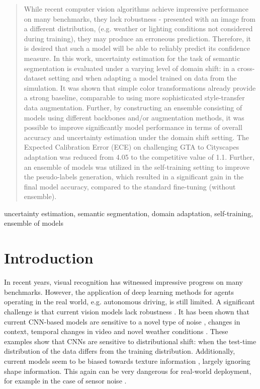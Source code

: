 \documentclass[conference]{IEEEtran}
\begin{document}
\begin{abstract}
While recent computer vision algorithms achieve impressive performance on many benchmarks, they lack robustness - presented with an image from a different distribution, (e.g. weather or lighting conditions not considered during training), they may produce an erroneous prediction. 
Therefore, it is desired that such a model will be able to reliably predict its confidence measure.
In this work, uncertainty estimation for the task of semantic segmentation is evaluated under a varying level of domain shift: in a cross-dataset setting and when adapting a model trained on data from the simulation. It was shown that simple color transformations already provide a strong baseline, comparable to using more sophisticated style-transfer data augmentation. Further, by constructing an ensemble consisting of models using different backbones and/or augmentation methods, it was possible to improve significantly model performance in terms of overall accuracy and uncertainty estimation under the domain shift setting.  The Expected Calibration Error (ECE) on challenging GTA to Cityscapes adaptation was reduced from 4.05 to the competitive value of 1.1.  Further, an ensemble of models was utilized in the self-training setting to improve the pseudo-labels generation, which resulted in a significant gain in the final model accuracy, compared to the standard fine-tuning (without ensemble).

\end{abstract}

\begin{IEEEkeywords}
uncertainty estimation, semantic segmentation, domain adaptation, self-training, ensemble of models
\end{IEEEkeywords}

\section{Introduction}

In recent years, visual recognition has witnessed impressive progress on many benchmarks. However, the application of deep learning methods for agents operating in the real world, e.g. autonomous driving, is still limited. A significant challenge is that current vision models lack robustness \cite{concrete}. It has been shown that current CNN-based models are sensitive to a novel type of noise \cite{dodge}, changes in context\cite{objectnet}, temporal changes in video \cite{temporal} and novel weather conditions \cite{winter}. These examples show that CNNs are sensitive to distributional shift: when the test-time distribution of the data differs from the training distribution. Additionally, current models seem to be biased towards texture information \cite{cnnbiased}, largely ignoring shape information. This again can be very dangerous for real-world deployment, for example in the case of sensor noise \cite{HendrycksD19}. 
\end{document}
